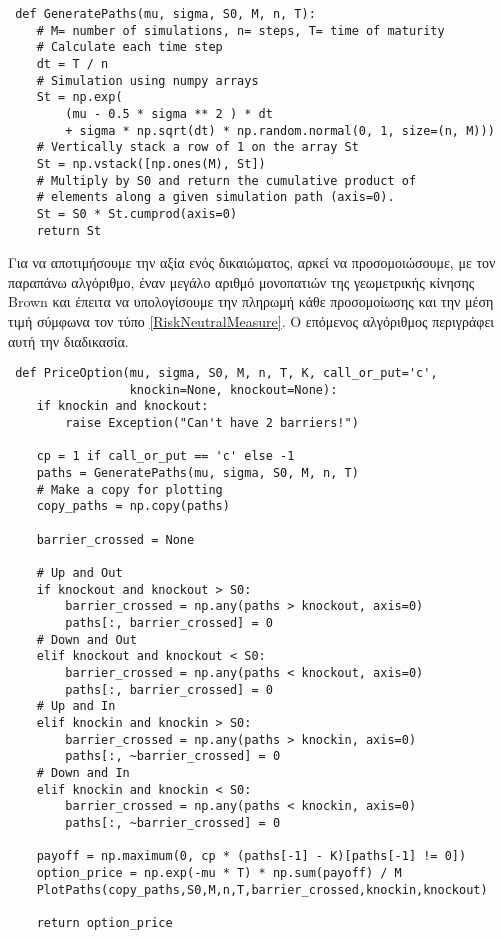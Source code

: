 \documentclass[12pt,a4paper,twoside,openany]{book}
\begin{document}
 \vspace{4mm}
 \begin{lstlisting}
 def GeneratePaths(mu, sigma, S0, M, n, T):
 	# M= number of simulations, n= steps, T= time of maturity
 	# Calculate each time step
 	dt = T / n
 	# Simulation using numpy arrays
 	St = np.exp( 
 		(mu - 0.5 * sigma ** 2 ) * dt
 		+ sigma * np.sqrt(dt) * np.random.normal(0, 1, size=(n, M)))
 	# Vertically stack a row of 1 on the array St
 	St = np.vstack([np.ones(M), St])  
 	# Multiply by S0 and return the cumulative product of 
 	# elements along a given simulation path (axis=0).
 	St = S0 * St.cumprod(axis=0) 
 	return St \end{lstlisting}
 	\vspace{4mm}
 	Για να αποτιμήσουμε την αξία ενός δικαιώματος, αρκεί να προσομοιώσουμε, με τον παραπάνω αλγόριθμο, έναν μεγάλο αριθμό μονοπατιών της γεωμετρικής κίνησης Brown και έπειτα να υπολογίσουμε την πληρωμή κάθε προσομοίωσης και την μέση τιμή σύμφωνα τον τύπο \eqref{RiskNeutralMeasure}. Ο επόμενος αλγόριθμος περιγράφει αυτή την διαδικασία.
 	\vspace{4mm}
 \begin{lstlisting}
 def PriceOption(mu, sigma, S0, M, n, T, K, call_or_put='c', 
 	 			 knockin=None, knockout=None):
 	if knockin and knockout:
 		raise Exception("Can't have 2 barriers!")
 	
 	cp = 1 if call_or_put == 'c' else -1
 	paths = GeneratePaths(mu, sigma, S0, M, n, T)
 	# Make a copy for plotting
 	copy_paths = np.copy(paths)
 	
 	barrier_crossed = None
 	
 	# Up and Out
 	if knockout and knockout > S0: 					
 		barrier_crossed = np.any(paths > knockout, axis=0)
 		paths[:, barrier_crossed] = 0
 	# Down and Out
 	elif knockout and knockout < S0: 				
 		barrier_crossed = np.any(paths < knockout, axis=0)
 		paths[:, barrier_crossed] = 0
 	# Up and In
 	elif knockin and knockin > S0: 					
 		barrier_crossed = np.any(paths > knockin, axis=0)
 		paths[:, ~barrier_crossed] = 0
 	# Down and In
 	elif knockin and knockin < S0: 					
 		barrier_crossed = np.any(paths < knockin, axis=0)
 		paths[:, ~barrier_crossed] = 0

 	payoff = np.maximum(0, cp * (paths[-1] - K)[paths[-1] != 0])
 	option_price = np.exp(-mu * T) * np.sum(payoff) / M
 	PlotPaths(copy_paths,S0,M,n,T,barrier_crossed,knockin,knockout)
 	
 	return option_price \end{lstlisting}
\end{document}
